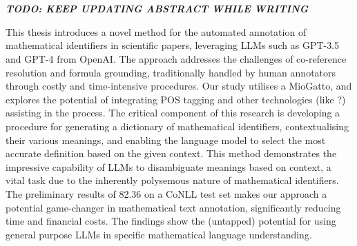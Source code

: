 \chapter{\abstractname}

\textbf{\textit{TODO: KEEP UPDATING ABSTRACT WHILE WRITING}}


This thesis introduces a novel method for the automated annotation of mathematical identifiers in scientific papers, leveraging \ac{LLMs} such as GPT-3.5 and GPT-4 from OpenAI. The approach addresses the challenges of co-reference resolution and formula grounding, traditionally handled by human annotators through costly and time-intensive procedures. Our study utilises a \ac{MioGatto}, and explores the potential of integrating \ac{POS} tagging and other technologies (like ?) assisting in the process.
The critical component of this research is developing a procedure for generating a dictionary of mathematical identifiers, contextualising their various meanings, and enabling the language model to select the most accurate definition based on the given context. This method demonstrates the impressive capability of LLMs to disambiguate meanings based on context, a vital task due to the inherently polysemous nature of mathematical identifiers.
The preliminary results of 82.36 on a \ac{CoNLL} test set  makes our approach a potential game-changer in mathematical text annotation, significantly reducing time and financial costs.
The findings show the (untapped) potential for using general purpose \ac{LLMs} in specific mathematical language understanding.


